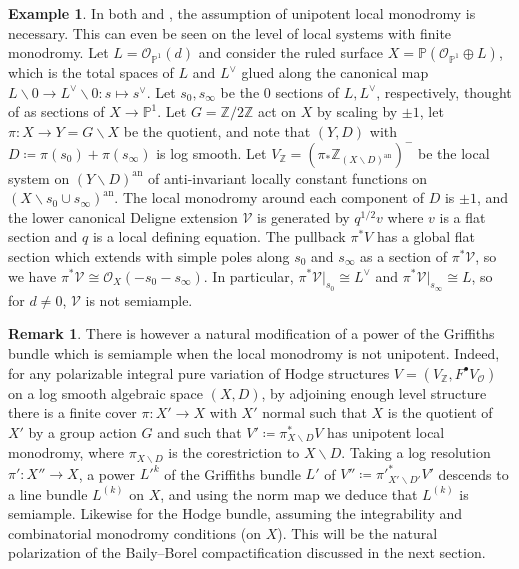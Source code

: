 \documentclass{amsart}
\newcommand{\bs}{\backslash}
\newcommand{\an}{\operatorname{an}}
\theoremstyle{definition}
\newtheorem{eg}[theorem]{Example}
\newtheorem{rem}[theorem]{Remark}
\theoremstyle{remark}
\def\bZ{\mathbb{Z}}
\def\bP{\mathbb{P}}
\def\cO{\mathcal{O}}
\def\cV{\mathcal{V}}
\def\an{\mathrm{an}}
\numberwithin{equation}{section}
\begin{document}
\begin{eg} In both  and , the assumption of unipotent local monodromy is necessary.  This can even be seen on the level of local systems with finite monodromy.  Let $L=\cO_{\bP^1}(d)$ and consider the ruled surface $X=\bP(\cO_{\bP^1}\oplus L)$, which is the total spaces of $L$ and $L^\vee$ glued along the canonical map $L\bs 0\to L^\vee\bs 0: s\mapsto s^{\vee}$.  Let $s_0,s_\infty$ be the 0 sections of $L,L^\vee$, respectively, thought of as sections of $X\to\bP^1$.  Let $G=\bZ/2\bZ$ act on $X$ by scaling by $\pm 1$, let $\pi:X\to Y=G\backslash X$ be the quotient, and note that $(Y,D)$ with $D\coloneqq  \pi(s_0)+\pi(s_\infty)$ is log smooth.  Let $V_\bZ=(\pi_*\bZ_{(X\bs D)^\an})^-$ be the local system on $(Y\bs D)^\an$ of anti-invariant locally constant functions on $(X\bs s_0\cup s_\infty)^\an$.  The local monodromy around each component of $D$ is $\pm 1$, and the lower canonical Deligne extension $\cV$ is generated by $q^{1/2}v$ where $v$ is a flat section and $q$ is a local defining equation.  The pullback $\pi^* V$ has a global flat section which extends with simple poles along $s_0$ and $s_\infty$ as a section of $\pi^*\cV$, so we have $\pi^*\cV\cong \cO_X(-s_0-s_\infty)$.  In particular, $\pi^*\cV|_{s_0}\cong L^\vee$ and $\pi^*\cV|_{s_\infty}\cong L$, so for $d\neq 0$, $\cV$ is not semiample.
\end{eg}
\begin{rem}

There is however a natural modification of a power of the Griffiths bundle which is semiample when the local monodromy is not unipotent.  Indeed, for any polarizable integral pure variation of Hodge structures $V=(V_\bZ,F^\bullet V_\cO)$ on a log smooth algebraic space $(X,D)$, by adjoining enough level structure there is a finite cover $\pi:X'\to X$ with $X'$ normal such that $X$ is the quotient of $X'$ by a group action $G$ and such that $V'\coloneqq  \pi_{X\bs D}^*V$ has unipotent local monodromy, where $\pi_{X\bs D}$ is the corestriction to $X\bs D$.  Taking a log resolution $\pi':X''\to X$, a power $L'^k$ of the Griffiths bundle $L'$ of $V'' \coloneqq \pi'^*_{X'\bs D'}V'$ descends to a line bundle $L^{(k)}$ on $X$, and using the norm map we deduce that $L^{(k)}$ is semiample.  Likewise for the Hodge bundle, assuming the integrability and combinatorial monodromy conditions (on $X$). This will be the natural polarization of the Baily--Borel compactification discussed in the next section.
\end{rem}
\end{document}
